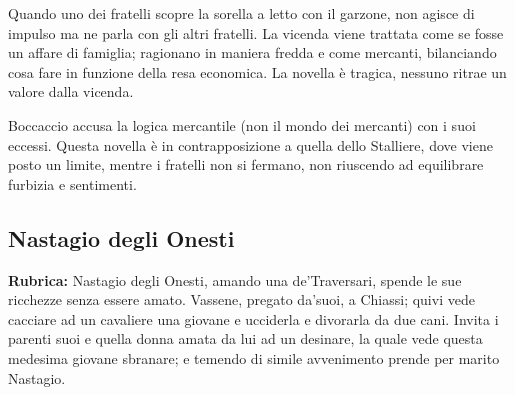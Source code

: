 \documentclass[a4paper]{article}
\begin{document}
Quando uno dei fratelli scopre la sorella a letto con il garzone, non agisce di impulso ma ne parla con gli altri fratelli.
La vicenda viene trattata come se fosse un affare di famiglia; ragionano in maniera fredda e come mercanti, bilanciando cosa fare in funzione della resa economica.
La novella è tragica, nessuno ritrae un valore dalla vicenda.

Boccaccio accusa la logica mercantile (non il mondo dei mercanti) con i suoi eccessi.
Questa novella è in contrapposizione a quella dello Stalliere, dove viene posto un limite, mentre i fratelli non si fermano, non riuscendo ad equilibrare furbizia e sentimenti.



\pagebreak

\subsection{Nastagio degli Onesti}

\textbf{Rubrica:} Nastagio degli Onesti, amando una de'Traversari,
spende le sue ricchezze senza essere amato.
Vassene, pregato da'suoi, a Chiassi; quivi vede cacciare ad un
cavaliere una giovane e ucciderla e divorarla da due cani.
Invita i parenti suoi e quella donna amata da lui ad un desinare,
la quale vede questa medesima giovane sbranare; e temendo di simile avvenimento
prende per marito Nastagio.
\end{document}
